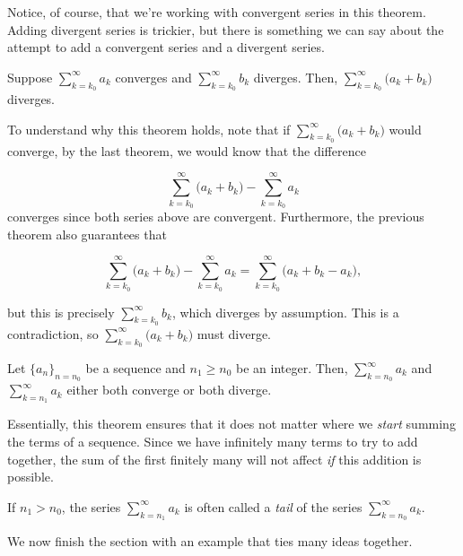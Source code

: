 \documentclass{ximera}
\begin{document}
Notice, of course, that we're working with convergent series in this 
theorem.  Adding divergent series is trickier, but there is something we can say about the attempt to add a convergent series and a divergent series.

\begin{theorem}
 Suppose $\sum_{k=k_0}^\infty a_k$ converges and  $\sum_{k=k_0}^\infty b_k$ diverges.  Then, $\sum_{k=k_0}^{\infty} \big(a_k+b_k\big)$ diverges.
\end{theorem}

To understand why this theorem holds, note that if $\sum_{k=k_0}^\infty \big(a_k+b_k\big)$ would converge, by the last theorem, we would know that the difference

\[\sum_{k=k_0}^\infty \big(a_k+b_k\big) -\sum_{k=k_0}^\infty a_k\]
converges since both series above are convergent.  Furthermore, the previous theorem also guarantees that

\[\sum_{k=k_0}^\infty \big(a_k+b_k\big) -\sum_{k=k_0}^\infty a_k = \sum_{k=k_0}^\infty \big(a_k+b_k -a_k\big),\]

but this is precisely $\sum_{k=k_0}^{\infty} b_k$, which diverges by assumption.  This is a contradiction, so  $\sum_{k=k_0}^\infty \big(a_k+b_k\big)$ must diverge.


\begin{theorem}
  Let $\{a_n\}_{n=n_0}$ be a sequence and $n_1 \geq n_0$ be an integer.  Then, $\sum_{k=n_0}^{\infty} a_k$ and $\sum_{k=n_1}^{\infty} a_k$ either both converge or both diverge.
\end{theorem}

Essentially, this theorem ensures that it does not matter where we \emph{start} summing the terms of a sequence.  Since we have infinitely many terms to try to add together, the sum of the first finitely many will not affect \emph{if} this addition is possible.

\begin{remark}
If $n_1>n_0$, the series $\sum_{k=n_1}^{\infty} a_k$ is often called a \emph{tail} of the series $\sum_{k=n_0}^{\infty} a_k$.
\end{remark}

We now finish the section with an example that ties many ideas together.
\end{document}
